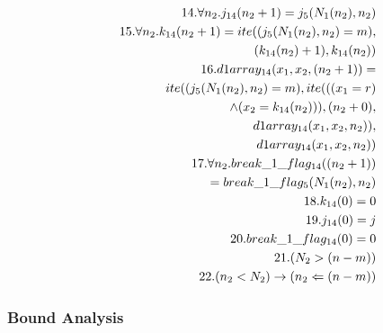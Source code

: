 \begin{eqnarray*}
	&&14.\forall n_2.j_{14}(n_2+1) = j_5(N_1(n_2),n_2)\\
	&&15.\forall n_2.k_{14}(n_2+1) = ite((j_5(N_1(n_2),n_2)=m),\\
	&&\hspace*{7em}(k_{14}(n_2)+1),k_{14}(n_2))\\
	&&16.d1array_{14}(x_1,x_2,(n_2+1)) = \\
	&&\hspace*{5em}ite((j_5(N_1(n_2),n_2)=m),ite(((x_1=r)\\
	&&\hspace*{7em}\land (x_2=k_{14}(n_2))),(n_2+0),\\
	&&\hspace*{10em}d1array_{14}(x_1,x_2,n_2)),\\
	&&\hspace*{12em}d1array_{14}(x_1,x_2,n_2))\\
	&&17.\forall n_2.break\_1\_flag_{14}((n_2+1))\\
	&&\hspace*{7em} = break\_1\_flag_{5}(N_1(n_2),n_2)\\
	&&18.k_{14}(0) = 0\\
	&&19.j_{14}(0) = j\\
	&&20.break\_1\_flag_{14}(0) = 0\\
	&&21.(N_2>(n-m)) \\
	&&22.(n_2<N_2) \rightarrow (n_2<=(n-m)) 
\end{eqnarray*}


\subsubsection{Bound Analysis}\label{example_details3}

